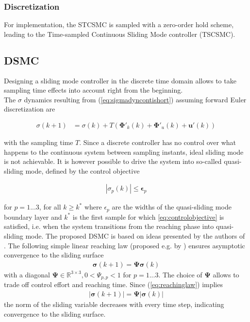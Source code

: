 \documentclass{ifacconf}
\providecommand{\mbf}[1]{\mathbf{#1}}
\newcommand{\idxSample}{{\ensuremath{k}}}
\newcommand{\idxAxis}{{\ensuremath{p}}}
\begin{document}
\subsubsection{\textbf{Discretization}}
For implementation, the STCSMC is sampled with a zero-order hold scheme, leading to the Time-sampled Continuous Sliding Mode controller (TSCSMC). 


\subsection{DSMC}
Designing a sliding mode controller in the discrete time domain allows to take sampling time effects into account right from the beginning. \\
The $\sigma$ dynamics resulting from (\ref{eq:sigmadyncontishort}) assuming forward Euler discretization are

\begin{align}
{{\sigma}}(\idxSample+1)
&=
{{\sigma}}(\idxSample)
+
T(
\mbf{\Phi}'_k(\idxSample) + \mbf{\Phi}'_u(\idxSample) + \mbf{u}'(\idxSample))
\label{eq:sigmadyndiscrete}
\end{align}

with the sampling time $T$. Since a discrete controller has no control over what happens to the continuous system between sampling instants, ideal sliding mode is not achievable. It is however possible to drive the system into so-called quasi-sliding mode, defined by the control objective

\begin{align}
|{\sigma}_\idxAxis (\idxSample)| \leq \mbf{\epsilon}_\idxAxis
\label{eq:controlobjective}
\end{align}

for $\idxAxis=1...3$, for all $\idxSample \geq \idxSample^*$ where $\epsilon_\idxAxis$ are the widths of the quasi-sliding mode boundary layer and $\idxSample^*$ is the first sample for which \ref{eq:controlobjective} is satisfied, i.e. when the system transitions from the reaching phase into quasi-sliding mode.
The proposed DSMC is based on ideas presented by the authors of \cite{monsees2001discrete}.
The following simple linear reaching law (proposed e.g. by \cite{Spurgeon1992}) ensures asymptotic convergence to the sliding surface
\begin{align}
\mbf{\sigma}(\idxSample+1) = \mbf{\Psi} \mbf{\sigma}(\idxSample)
\label{eq:reachinglaw}
\end{align}
with a diagonal $\mbf{\Psi} \in \mathbb{R}^{3 \times 3}, 0 < \Psi_{\idxAxis,\idxAxis} < 1$ for $\idxAxis=1...3$. The choice of $\mbf{\Psi}$ allows to trade off control effort and reaching time.
Since (\ref{eq:reachinglaw}) implies
\begin{align}
|\mbf{\sigma}(\idxSample+1)| = \mbf{\Psi} |\mbf{\sigma}(\idxSample)|
\end{align}
the norm of the sliding variable decreases with every time step, indicating convergence to the sliding surface. 
\end{document}
